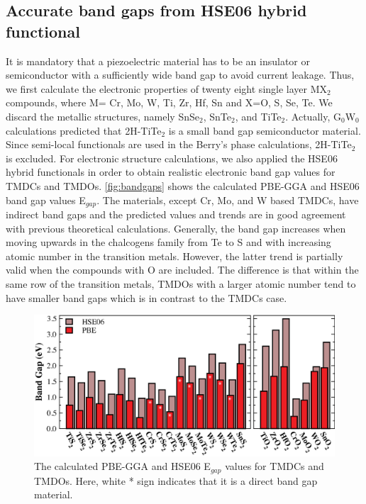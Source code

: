 \subsection{Accurate band gaps from HSE06 hybrid functional}

It is mandatory that a piezoelectric material has to be an insulator or semiconductor with a sufficiently wide band gap to avoid current leakage. Thus, we first calculate the electronic properties of twenty eight single layer MX$_2$ compounds, where M= Cr,  Mo, W, Ti, Zr, Hf, Sn and X=O, S, Se, Te. We discard the metallic structures, namely SnSe$_2$, SnTe$_2$, and TiTe$_2$. Actually, G$_0$W$_0$ calculations predicted that 2H-TiTe$_2$ is a small band gap semiconductor material\cite{Rasmussen2015}. Since semi-local functionals are used in the Berry's phase calculations, 2H-TiTe$_2$ is excluded. For electronic structure calculations, we also applied the HSE06 hybrid functionals in order to obtain realistic electronic band gap values for TMDCs and TMDOs. \autoref{fig:bandgaps} shows the calculated PBE-GGA and HSE06 band gap values E$_{gap}$. The materials, except Cr, Mo, and W based TMDCs, have indirect band gaps and the predicted values and trends are in good agreement with previous theoretical calculations\cite{Duerloo2012,Ataca2012,Guo2014a}. Generally, the band gap increases when moving upwards in the chalcogens family from Te to S and with increasing atomic number in the transition metals. However, the latter trend is partially valid when the compounds with O are included. The difference is that within the same row of the transition metals, TMDOs with a larger atomic number tend to have smaller band gaps which is in contrast to the TMDCs case.

\begin{figure}[htbp]
\centering
\includegraphics[width=0.8\linewidth]{bandgaps.eps}
\caption{\label{fig:bandgaps}The calculated PBE-GGA and HSE06 E$_{gap}$ values for TMDCs and TMDOs. Here, white * sign indicates that it is a direct band gap material.}
\end{figure}

